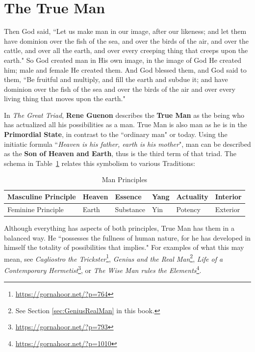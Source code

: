 \section{The True Man}

\begin{quotex}
Then God said, ``Let us make man in our image, after our likeness; and let them have dominion over the fish of the sea, and over the birds of the air, and over the cattle, and over all the earth, and over every creeping thing that creeps upon the earth." So God created man in His own image, in the image of God He created him; male and female He created them. And God blessed them, and God said to them, ``Be fruitful and multiply, and fill the earth and subdue it; and have dominion over the fish of the sea and over the birds of the air and over every living thing that moves upon the earth." 

\end{quotex}

In \emph{The Great Triad}, \textbf{Rene Guenon} describes the \textbf{True Man} as the being who has actualized all his possibilities as a man. True Man is also man as he is in the \textbf{Primordial State}, in contrast to the ``ordinary man" or today. Using the initiatic formula ``\emph{Heaven is his father, earth is his mother}", man can be described as the \textbf{Son of Heaven and Earth}, thus is the third term of that triad. The schema in Table~\ref{tab:ManPrinciples} relates this symbolism to various Traditions:

\begin{table}[h]\small
\begin{tabularx}{\textwidth}{*6{X}}\toprule
Masculine Principle &
Heaven &
Essence &
Yang &
Actuality &
Interior\\\midrule
Feminine Principle &
Earth &
Substance &
Yin &
Potency &
Exterior\\\bottomrule
\end{tabularx}
\label{tab:ManPrinciples}
\caption{Man Principles}
\end{table}
Although everything has aspects of both principles, True Man has them in a balanced way. He ``possesses the fullness of human nature, for he has developed in himself the totality of possibilities that implies." For examples of what this may mean, see \textit{Cagliostro the Trickster}\footnote{\url{https://gornahoor.net/?p=764}}, \textit{Genius and the Real Man}\footnote{See Section \ref{sec:GeniusRealMan} in this book.}, \textit{Life of a Contemporary Hermetist}\footnote{\url{https://gornahoor.net/?p=793}}, or \textit{The Wise Man rules the Elements}\footnote{\url{https://gornahoor.net/?p=1010}}. 

